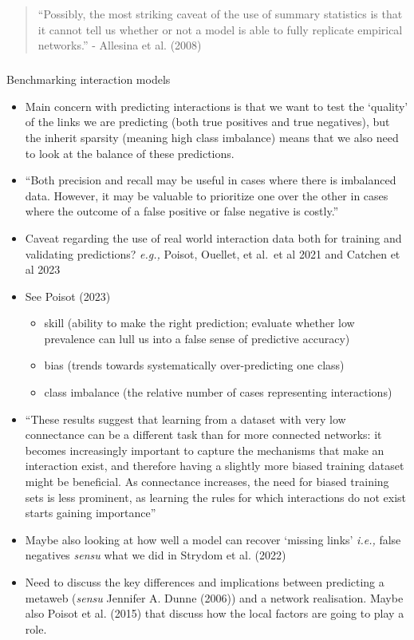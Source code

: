 \documentclass[
]{agujournal2019}
\makeatletter
\let\oldsubparagraph\subparagraph
\renewcommand{\subparagraph}{
    \@ifstar
      \xxxSubParagraphStar
      \xxxSubParagraphNoStar
  }
\newcommand{\xxxSubParagraphStar}[1]{\oldsubparagraph*{#1}\mbox{}}
\newcommand{\xxxSubParagraphNoStar}[1]{\oldsubparagraph{#1}\mbox{}}
\makeatother
\begin{document}
\begin{quote}
``Possibly, the most striking caveat of the use of summary statistics is
that it cannot tell us whether or not a model is able to fully replicate
empirical networks.'' - Allesina et al. (2008)
\end{quote}

\subparagraph{Benchmarking interaction
models}\label{benchmarking-interaction-models}

\begin{itemize}
\item
  Main concern with predicting interactions is that we want to test the
  `quality' of the links we are predicting (both true positives and true
  negatives), but the inherit sparsity (meaning high class imbalance)
  means that we also need to look at the balance of these predictions.
\item
  ``Both precision and recall may be useful in cases where there is
  imbalanced data. However, it may be valuable to prioritize one over
  the other in cases where the outcome of a false positive or false
  negative is costly.''
\item
  Caveat regarding the use of real world interaction data both for
  training and validating predictions? \emph{e.g.,} Poisot, Ouellet, et
  al.~et al 2021 and Catchen et al 2023
\item
  See Poisot (2023)

  \begin{itemize}
  \item
    skill (ability to make the right prediction; evaluate whether low
    prevalence can lull us into a false sense of predictive accuracy)
  \item
    bias (trends towards systematically over-predicting one class)
  \item
    class imbalance (the relative number of cases representing
    interactions)
  \end{itemize}
\item
  ``These results suggest that learning from a dataset with very low
  connectance can be a different task than for more connected networks:
  it becomes increasingly important to capture the mechanisms that make
  an interaction exist, and therefore having a slightly more biased
  training dataset might be beneficial. As connectance increases, the
  need for biased training sets is less prominent, as learning the rules
  for which interactions do not exist starts gaining importance''
\item
  Maybe also looking at how well a model can recover `missing links'
  \emph{i.e.,} false negatives \emph{sensu} what we did in Strydom et
  al. (2022)
\item
  Need to discuss the key differences and implications between
  predicting a metaweb (\emph{sensu} Jennifer A. Dunne (2006)) and a
  network realisation. Maybe also Poisot et al. (2015) that discuss how
  the local factors are going to play a role.
\end{itemize}
\end{document}
